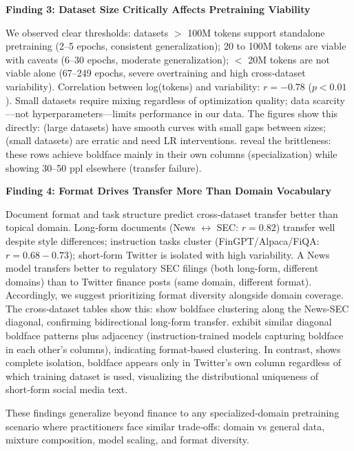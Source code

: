 \textbf{Finding 3: Dataset Size Critically Affects Pretraining Viability}

We observed clear thresholds: datasets $>$ 100M tokens support standalone pretraining (2–5 epochs, consistent generalization); 20 to 100M tokens are viable with caveats (6–30 epochs, moderate generalization); $<$ 20M tokens are not viable alone (67–249 epochs, severe overtraining and high cross‑dataset variability). Correlation between log(tokens) and variability: $r = -0.78$ ($p < 0.01$). Small datasets require mixing regardless of optimization quality; data scarcity—not hyperparameters—limits performance in our data. The figures show this directly:  (large datasets) have smooth curves with small gaps between sizes;  (small datasets) are erratic and need LR interventions.  reveal the brittleness: these rows achieve boldface mainly in their own columns (specialization) while showing 30–50 ppl elsewhere (transfer failure).

\textbf{Finding 4: Format Drives Transfer More Than Domain Vocabulary}

Document format and task structure predict cross‑dataset transfer better than topical domain. Long‑form documents (News $\leftrightarrow$ SEC: $r = 0.82$) transfer well despite style differences; instruction tasks cluster (FinGPT/Alpaca/FiQA: $r = 0.68-0.73$); short‑form Twitter is isolated with high variability. A News model transfers better to regulatory SEC filings (both long-form, different domains) than to Twitter finance posts (same domain, different format). Accordingly, we suggest prioritizing format diversity alongside domain coverage. The cross‑dataset tables show this:  show boldface clustering along the News-SEC diagonal, confirming bidirectional long-form transfer.  exhibit similar diagonal boldface patterns plus adjacency (instruction-trained models capturing boldface in each other's columns), indicating format-based clustering. In contrast,  shows complete isolation, boldface appears only in Twitter's own column regardless of which training dataset is used, visualizing the distributional uniqueness of short‑form social media text.

These findings generalize beyond finance to any specialized‑domain pretraining scenario where practitioners face similar trade‑offs: domain vs general data, mixture composition, model scaling, and format diversity.

